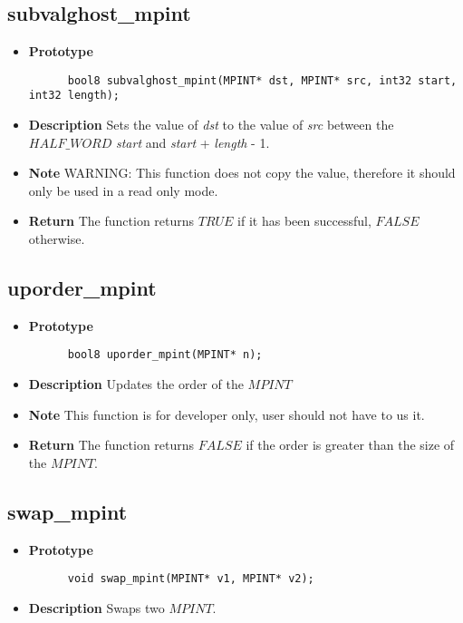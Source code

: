\documentclass[10pt,a4paper]{article}
\begin{document}
  \subsection{subvalghost\_mpint}
  
  \begin{itemize}
    \item [] \textbf{Prototype}
    \begin{lstlisting}
      bool8 subvalghost_mpint(MPINT* dst, MPINT* src, int32 start, int32 length);
    \end{lstlisting}
    \item [] \textbf{Description} Sets the value of \textit{dst} to the value of \textit{src} between the $HALF\_WORD$ \textit{start} and \textit{start} + \textit{length} - 1.
    \item [] \textbf{Note} WARNING: This function does not copy the value, therefore it should only be used in a read only mode.
    \item [] \textbf{Return} The function returns $TRUE$ if it has been successful, $FALSE$ otherwise.
  \end{itemize}
  
  \subsection{uporder\_mpint}
  
  \begin{itemize}
    \item [] \textbf{Prototype}
    \begin{lstlisting}
      bool8 uporder_mpint(MPINT* n);
    \end{lstlisting}
    \item [] \textbf{Description} Updates the order of the $MPINT$
    \item [] \textbf{Note} This function is for developer only, user should not have to us it.
    \item [] \textbf{Return} The function returns $FALSE$ if the order is greater than the size of the $MPINT$.
  \end{itemize}
  
  \subsection{swap\_mpint}
  
  \begin{itemize}
    \item [] \textbf{Prototype}
    \begin{lstlisting}
      void swap_mpint(MPINT* v1, MPINT* v2);
    \end{lstlisting}
    \item [] \textbf{Description} Swaps two $MPINT$.
  \end{itemize}
  
\end{document}
